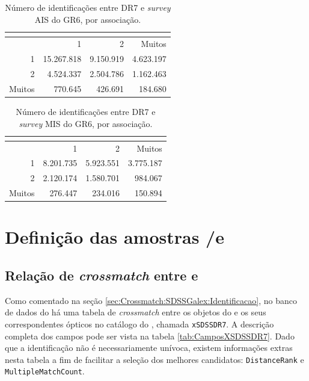 \begin{table}
	\caption[Identificações entre \SDSS DR7 e {\em survey} AIS do \galex GR6.]
	{Número de identificações entre \SDSS DR7 e {\em survey} AIS do \galex GR6, por
	associação.}
	\setlength{\tabcolsep}{1cm}
	\begin{tabular}{r r r r}
		\galex &          \multicolumn{3}{c}{\SDSS} \\
		\midrule
		       &          1 &         2 &    Muitos \\
		1      & 15.267.818 & 9.150.919 & 4.623.197 \\
		2      &  4.524.337 & 2.504.786 & 1.162.463 \\
		Muitos &    770.645 &   426.691 &   184.680 \\
	\end{tabular}
	\label{tab:SDSSxGalexMatchesAIS}
\end{table}

\begin{table}
	\caption[Identificações entre \SDSS DR7 e {\em survey} AIS do \galex GR6.]
	{Número de identificações entre \SDSS DR7 e {\em survey} MIS do \galex GR6, por
	associação.}
	\setlength{\tabcolsep}{1cm}
	\begin{tabular}{r r r r}
		\galex &         \multicolumn{3}{c}{\SDSS} \\
		\midrule
		       &         1 &         2 &    Muitos \\
		1      & 8.201.735 & 5.923.551 & 3.775.187 \\
		2      & 2.120.174 & 1.580.701 &   984.067 \\
		Muitos &   276.447 &   234.016 &   150.894 \\
	\end{tabular}
	\label{tab:SDSSxGalexMatchesMIS}
\end{table}



\section{Definição das amostras \SDSS/\STARLIGHT e \galex}
\label{sec:Crossmatch:DefAmostras}

\subsection{Relação de {\em crossmatch} entre \SDSS e \galex}
Como comentado na seção \ref{sec:Crossmatch:SDSSGalex:Identificacao}, no banco
de dados do \galex há uma tabela de {\em crossmatch} entre os objetos do \galex
e os seus correspondentes ópticos no catálogo do \SDSS, chamada {\tt xSDSSDR7}.
A descrição completa dos campos pode ser vista na tabela
\ref{tab:CamposXSDSSDR7}. Dado que a identificação não é necessariamente
unívoca, existem informações extras nesta tabela a fim de facilitar a seleção
dos melhores candidatos: {\tt DistanceRank} e {\tt MultipleMatchCount}.

